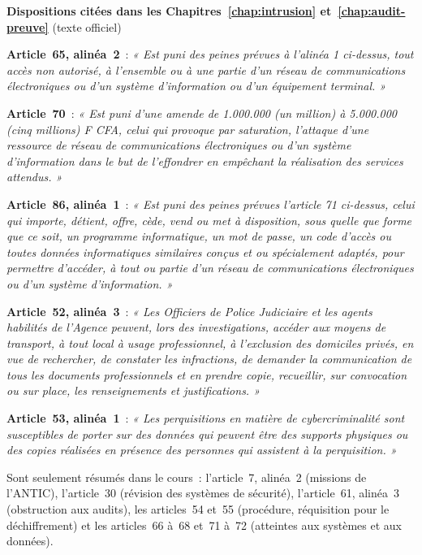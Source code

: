 \begin{boxjuris}
\textbf{Dispositions citées dans les Chapitres~\ref{chap:intrusion}
et~\ref{chap:audit-preuve}} (texte officiel)

\medskip
\textbf{Article~65, alinéa~2}~: \textit{« Est puni des peines prévues à
l'alinéa 1 ci-dessus, tout accès non autorisé, à l'ensemble ou à une
partie d'un réseau de communications électroniques ou d'un système
d'information ou d'un équipement terminal. »}

\medskip
\textbf{Article~70}~: \textit{« Est puni d'une amende de 1.000.000 (un
million) à 5.000.000 (cinq millions) F CFA, celui qui provoque par
saturation, l'attaque d'une ressource de réseau de communications
électroniques ou d'un système d'information dans le but de l'effondrer en
empêchant la réalisation des services attendus. »}

\medskip
\textbf{Article~86, alinéa~1}~: \textit{« Est puni des peines prévues
l'article 71 ci-dessus, celui qui importe, détient, offre, cède, vend ou
met à disposition, sous quelle que forme que ce soit, un programme
informatique, un mot de passe, un code d'accès ou toutes données
informatiques similaires conçus et ou spécialement adaptés, pour permettre
d'accéder, à tout ou partie d'un réseau de communications électroniques ou
d'un système d'information. »}

\medskip
\textbf{Article~52, alinéa~3}~: \textit{« Les Officiers de Police Judiciaire
et les agents habilités de l'Agence peuvent, lors des investigations,
accéder aux moyens de transport, à tout local à usage professionnel, à
l'exclusion des domiciles privés, en vue de rechercher, de constater les
infractions, de demander la communication de tous les documents
professionnels et en prendre copie, recueillir, sur convocation ou sur
place, les renseignements et justifications. »}

\medskip
\textbf{Article~53, alinéa~1}~: \textit{« Les perquisitions en matière de
cybercriminalité sont susceptibles de porter sur des données qui peuvent
être des supports physiques ou des copies réalisées en présence des
personnes qui assistent à la perquisition. »}
\end{boxjuris}

Sont seulement résumés dans le cours~: l'article~7, alinéa~2 (missions de
l'ANTIC), l'article~30 (révision des systèmes de sécurité), l'article~61,
alinéa~3 (obstruction aux audits), les articles~54 et~55 (procédure,
réquisition pour le déchiffrement) et les articles~66 à~68 et~71 à~72
(atteintes aux systèmes et aux données).

